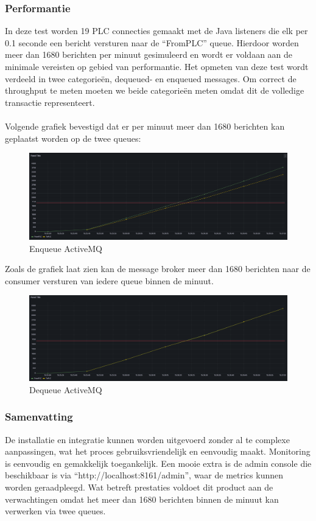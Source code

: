 \subsubsection{Performantie}
In deze test worden 19 PLC connecties gemaakt met de Java listeners die elk per 0.1 seconde een bericht versturen naar de  ``FromPLC'' queue.
Hierdoor worden meer dan 1680 berichten per minuut gesimuleerd en wordt er voldaan aan de minimale vereisten op gebied van performantie.
Het opmeten van deze test wordt verdeeld in twee categorieën, dequeued- en enqueued messages.
Om correct de throughput te meten moeten we beide categorieën meten omdat dit de volledige transactie representeert. 
\\\\
Volgende grafiek bevestigd dat er per minuut meer dan 1680 berichten kan geplaatst worden op de twee queues:
\begin{figure}[h!]
  \centering
  \includegraphics[width=.95\textwidth]{img/amq-enqueue-count.png}
  \caption{\label{fig:amq_enqueue_count}Enqueue ActiveMQ}
\end{figure}
\newpage
Zoals de grafiek laat zien kan de message broker meer dan 1680 berichten naar de consumer versturen van iedere queue binnen de minuut.
\begin{figure}[h!]
  \centering
  \includegraphics[width=.95\textwidth]{img/amq-dequeue-count.png}
  \caption{\label{fig:amq_dequeue_count}Dequeue ActiveMQ}
\end{figure}

\subsubsection{Samenvatting}
De installatie en integratie kunnen worden uitgevoerd zonder al te complexe aanpassingen, 
wat het proces gebruiksvriendelijk en eenvoudig maakt.
Monitoring is eenvoudig en gemakkelijk toegankelijk. 
Een mooie extra is de admin console die beschikbaar is via ``http://localhost:8161/admin'', waar de metrics kunnen worden geraadpleegd.
Wat betreft prestaties voldoet dit product aan de verwachtingen omdat het meer dan 1680 berichten  binnen de minuut kan verwerken via twee queues.


